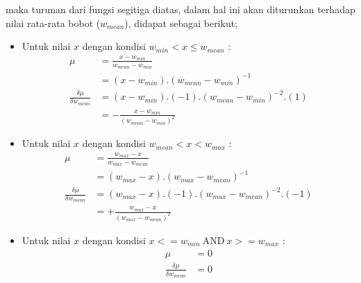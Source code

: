 \noindent maka turunan dari fungsi segitiga diatas, dalam hal ini akan
diturunkan terhadap nilai rata-rata bobot ($w_{mean}$), didapat sebagai berikut;
\begin{itemize}
  \item Untuk nilai $x$ dengan kondisi $w_{min} < x \leq w_{mean}$ :
  \begin{align}
	\label{eq:trim1}
		\mu &= \frac{x - w_{min}}{w_{mean} - w_{min}} \nonumber \\
			&= (x - w_{min}) . (w_{mean} - w_{min})^{-1} \nonumber \\
		\frac{\delta \mu}{\delta w_{mean}} &=
		(x - w_{min}).(-1).(w_{mean} - w_{min})^{-2}.(1) \nonumber \\
		 &=
		- \frac{x - w_{min}}{(w_{mean} - w_{min})^2}
	\end{align}

	\item Untuk nilai $x$ dengan kondisi  $w_{mean} < x < w_{max}$ :
	\begin{align}
	\label{eq:trim2}
		\mu &= \frac{w_{max} - x}{w_{max} - w_{mean}} \nonumber \\
			&= (w_{max} - x) . (w_{max} - w_{mean})^{-1} \nonumber \\
		\frac{\delta \mu}{\delta w_{mean}} &=
		(w_{max} - x).(-1).(w_{max} - w_{mean})^{-2}.(-1) \nonumber \\
		 &=
		+ \frac{w_{max} - x}{(w_{max} - w_{mean})^2}
	\end{align}
	
	\item Untuk nilai $x$ dengan kondisi $x <= w_{min}\ \text{AND}\ x >= w_{max}$ :
	\begin{align}
	\label{eq:trim3}
		\mu &= 0 \nonumber \\
		\frac{\delta \mu}{\delta w_{mean}} &= 0
	\end{align}
\end{itemize}

